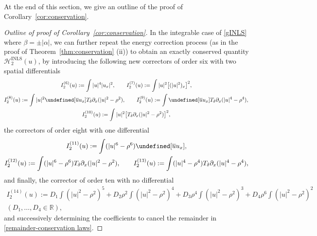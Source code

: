 \documentclass{amsart}
\numberwithin{equation}{section}
\newcommand{\R}{\mathbb{R}}
\newcommand{\Td}{T_{\delta}}
\let\Im=\undefined\DeclareMathOperator{\Im}{Im}
\begin{document}
\medskip
At the end of this section, we give an outline of the proof of Corollary~\ref{cor:conservation}.

\begin{proof}[Outline of proof of Corollary~\ref{cor:conservation}]
 In the integrable case of \eqref{gINLS} where $\beta =\pm |\alpha|$, we can further repeat the energy correction process (as in the proof of Theorem~\ref{thm:conservation} (ii)) to obtain an exactly conserved quantity $\mathcal{H}^{\mathrm{INLS}}_2(u)$, by introducing the following new correctors of order six with two spatial differentials
\begin{gather*}
I_2^{(6)}(u):=\int |u|^4|u_x|^2 ,\qquad
I_2^{(7)}(u):=\int |u|^2\big[(|u|^2)_x\big]^2 ,\\
I_2^{(8)}(u):=\int |u|^2\Im[\overline{u}u_x]\Td\partial_x(|u|^2-\rho^2) ,\qquad
I_2^{(9)}(u):=\int \Im[\overline{u}u_x]\Td\partial_x(|u|^4-\rho^4) ,\\
I_2^{(10)}(u):=\int |u|^2\big[ \Td \partial_x(|u|^2-\rho^2)\big]^2,
\end{gather*}
the correctors of order eight with one differential
\begin{gather*}
I_2^{(11)}(u):=\int (|u|^6-\rho^6)\Im [\overline{u}u_x],\\
I_2^{(12)}(u):=\int (|u|^6-\rho^6)\Td\partial_x(|u|^2-\rho^2),\qquad
I_2^{(13)}(u):=\int (|u|^4-\rho^4)\Td\partial_x(|u|^4-\rho^4),\end{gather*}
and finally, the corrector of order ten with no differential
\begin{align*}
I_2^{(14)}(u):=D_1\int (|u|^2-\rho^2)^5 +D_2\rho^2\int (|u|^2-\rho^2)^4+D_3\rho^4\int (|u|^2-\rho^2)^3+D_4\rho^6\int (|u|^2-\rho^2)^2\\
(D_1,\dots ,D_4\in \R), 
\end{align*}
and successively determining the coefficients to cancel the remainder in \eqref{remainder-conservation laws}.


\end{proof}
\end{document}
